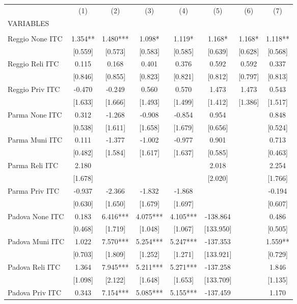 \begin{tabular}{lccccccc} \hline
 & (1) & (2) & (3) & (4) & (5) & (6) & (7) \\
VARIABLES &  &  &  &  &  &  &  \\ \hline
 &  &  &  &  &  &  &  \\
Reggio None ITC & 1.354** & 1.480*** & 1.098* & 1.119* & 1.168* & 1.168* & 1.118** \\
 & [0.559] & [0.573] & [0.583] & [0.585] & [0.639] & [0.628] & [0.568] \\
Reggio Reli ITC & 0.115 & 0.168 & 0.401 & 0.376 & 0.592 & 0.592 & 0.337 \\
 & [0.846] & [0.855] & [0.823] & [0.821] & [0.812] & [0.797] & [0.813] \\
Reggio Priv ITC & -0.470 & -0.249 & 0.560 & 0.570 & 1.473 & 1.473 & 0.543 \\
 & [1.633] & [1.666] & [1.493] & [1.499] & [1.412] & [1.386] & [1.517] \\
Parma None ITC & 0.312 & -1.268 & -0.908 & -0.854 & 0.954 &  & 0.848 \\
 & [0.538] & [1.611] & [1.658] & [1.679] & [0.656] &  & [0.524] \\
Parma Muni ITC & 0.111 & -1.377 & -1.002 & -0.977 & 0.901 &  & 0.713 \\
 & [0.482] & [1.584] & [1.617] & [1.637] & [0.585] &  & [0.463] \\
Parma Reli ITC & 2.180 &  &  &  & 2.018 &  & 2.254 \\
 & [1.678] &  &  &  & [2.020] &  & [1.766] \\
Parma Priv ITC & -0.937 & -2.366 & -1.832 & -1.868 &  &  & -0.194 \\
 & [0.630] & [1.650] & [1.679] & [1.697] &  &  & [0.607] \\
Padova None ITC & 0.183 & 6.416*** & 4.075*** & 4.105*** & -138.864 &  & 0.486 \\
 & [0.468] & [1.719] & [1.048] & [1.067] & [133.950] &  & [0.505] \\
Padova Muni ITC & 1.022 & 7.570*** & 5.254*** & 5.247*** & -137.353 &  & 1.559** \\
 & [0.703] & [1.809] & [1.252] & [1.271] & [133.921] &  & [0.729] \\
Padova Reli ITC & 1.364 & 7.945*** & 5.211*** & 5.271*** & -137.258 &  & 1.846 \\
 & [1.098] & [2.122] & [1.648] & [1.653] & [133.709] &  & [1.135] \\
Padova Priv ITC & 0.343 & 7.154*** & 5.085*** & 5.155*** & -137.459 &  & 1.170 \\

\end{tabular}

